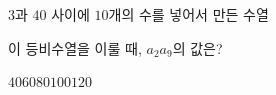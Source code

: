 $3$과 $40$ 사이에 $10$개의 수를 넣어서 만든 수열 \par\smallskip{}\par\smallskip\noindent 이 등비수열을 이룰 때, $a_2a_9$의 값은?
\begin{choices32}{$40$}{$60$}{$80$}{$100$}{$120$}\end{choices32}
